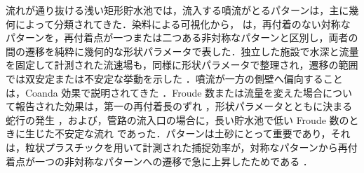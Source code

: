 \begin{ja}
流れが通り抜ける浅い矩形貯水池では，流入する噴流がとるパターンは，主に幾何によって分類されてきた．染料による可視化から，\citet{dufresneClassificationFlowPatterns2010} は，再付着のない対称なパターンを，再付着点が一つまたは二つある非対称なパターンと区別し，両者の間の遷移を純粋に幾何的な形状パラメータで表した．独立した施設で水深と流量を固定して計測された流速場も，同様に形状パラメータで整理され，遷移の範囲では双安定または不安定な挙動を示した \citep{camnasioExperimentalStudyVelocity2011}．噴流が一方の側壁へ偏向することは，Coanda 効果で説明されてきた \citep{dewalsExperimentalNumericalAnalysis2008,camnasioExperimentalStudyVelocity2011}．Froude 数または流量を変えた場合について報告された効果は，第一の再付着長のずれ \citep{dufresneClassificationFlowPatterns2010}，形状パラメータとともに決まる蛇行の発生 \citep{peltierExperimentalInvestigationMeandering2014}，および，管路の流入口の場合に，長い貯水池で低い Froude 数のときに生じた不安定な流れ \citep{chagdaliFlowPatternsShallow2025} であった．パターンは土砂にとって重要であり，それは，粒状プラスチックを用いて計測された捕捉効率が，対称なパターンから再付着点が一つの非対称なパターンへの遷移で急に上昇したためである \citep{dufresneExperimentalInvestigationFlow2010}．
\end{ja}


